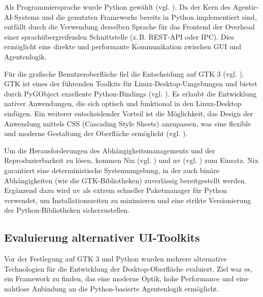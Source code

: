 Als Programmiersprache wurde Python gewählt (vgl. \cite{python}). Da der Kern des Agentic-AI-Systems und die genutzten Frameworks bereits in Python implementiert sind, entfällt durch die Verwendung derselben Sprache für das Frontend der Overhead einer sprachübergreifenden Schnittstelle (z.\,B. REST-API oder IPC). Dies ermöglicht eine direkte und performante Kommunikation zwischen GUI und Agentenlogik.

Für die grafische Benutzeroberfläche fiel die Entscheidung auf GTK 3 (vgl. \cite{gtk3}). GTK ist eines der führenden Toolkits für Linux-Desktop-Umgebungen und bietet durch PyGObject exzellente Python-Bindings (vgl. \cite{pygobject}). Es erlaubt die Entwicklung nativer Anwendungen, die sich optisch und funktional in den Linux-Desktop einfügen. Ein weiterer entscheidender Vorteil ist die Möglichkeit, das Design der Anwendung mittels CSS (Cascading Style Sheets) anzupassen, was eine flexible und moderne Gestaltung der Oberfläche ermöglicht (vgl. \cite{w3c_css}).

Um die Herausforderungen des Abhängigkeitsmanagements und der Reproduzierbarkeit zu lösen, kommen Nix (vgl. \cite{nixos}) und uv (vgl. \cite{astral_uv}) zum Einsatz. Nix garantiert eine deterministische Systemumgebung, in der auch binäre Abhängigkeiten (wie die GTK-Bibliotheken) zuverlässig bereitgestellt werden. Ergänzend dazu wird uv als extrem schneller Paketmanager für Python verwendet, um Installationszeiten zu minimieren und eine strikte Versionierung der Python-Bibliotheken sicherzustellen.

\subsection{Evaluierung alternativer UI-Toolkits}

Vor der Festlegung auf GTK 3 und Python wurden mehrere alternative Technologien für die Entwicklung der Desktop-Oberfläche evaluiert. Ziel war es, ein Framework zu finden, das eine moderne Optik, hohe Performance und eine nahtlose Anbindung an die Python-basierte Agentenlogik ermöglicht.

